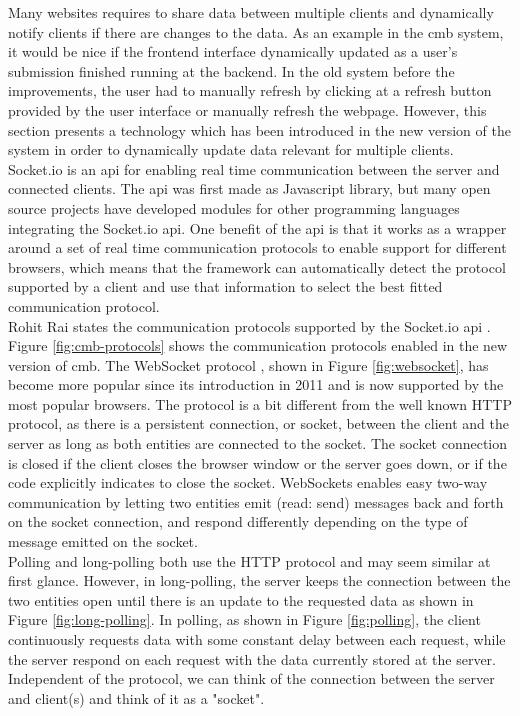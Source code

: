 Many websites requires to share data between multiple clients and dynamically notify clients if there are changes to the data. As an example in the \gls{cmb} system, it would be nice if the frontend interface dynamically updated as a user's submission finished running at the backend. In the old system before the improvements, the user had to manually refresh by clicking at a refresh button provided by the user interface or manually refresh the webpage. However, this section presents a technology which has been introduced in the new version of the system in order to dynamically update data relevant for multiple clients. \\

Socket.io \cite{SOCKETIO} is an \gls{api} for enabling real time communication between the server and connected clients. The \gls{api} was first made as Javascript library, but many open source projects have developed modules for other programming languages integrating the Socket.io \gls{api}. One benefit of the \gls{api} is that it works as a wrapper around a set of real time communication protocols to enable support for different browsers, which means that the framework can automatically detect the protocol supported by a client and use that information to select the best fitted communication protocol. \\

Rohit Rai states the communication protocols supported by the Socket.io \gls{api} \cite{Rai2013}. Figure \ref{fig:cmb-protocols} shows the communication protocols enabled in the new version of \gls{cmb}. The WebSocket protocol \cite{a:Fette2011}, shown in Figure \ref{fig:websocket}, has become more popular since its introduction in 2011 and is now supported by the most popular browsers. The protocol is a bit different from the well known HTTP protocol, as there is a persistent connection, or socket, between the client and the server as long as both entities are connected to the socket. The socket connection is closed if the client closes the browser window or the server goes down, or if the code explicitly indicates to close the socket. WebSockets enables easy two-way communication by letting two entities emit (read: send) messages back and forth on the socket connection, and respond differently depending on the type of message emitted on the socket. \\

Polling and long-polling both use the HTTP protocol and may seem similar at first glance. However, in long-polling, the server keeps the connection between the two entities open until there is an update to the requested data as shown in Figure \ref{fig:long-polling}. In polling, as shown in Figure \ref{fig:polling}, the client continuously requests data with some constant delay between each request, while the server respond on each request with the data currently stored at the server. Independent of the protocol, we can think of the connection between the server and client(s) and think of it as a "socket". \\

